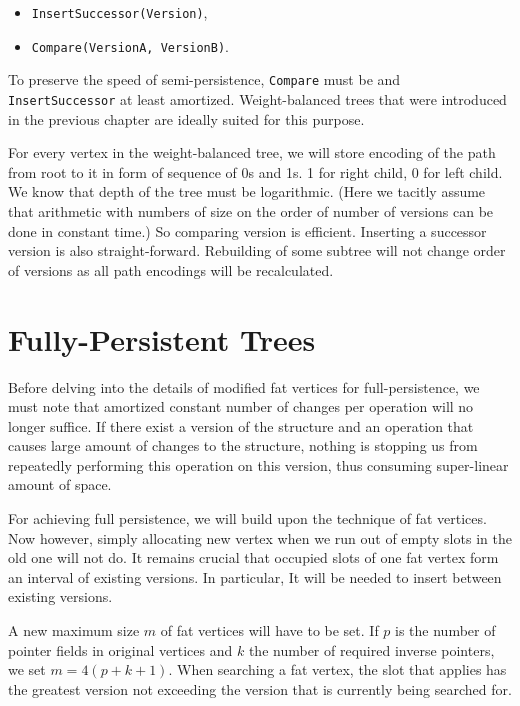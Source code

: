 \begin{itemize}
	\item \texttt{InsertSuccessor(Version)},
	\item \texttt{Compare(VersionA, VersionB)}.
\end{itemize}

To preserve the speed of semi-persistence, \texttt{Compare} must be  and \texttt{InsertSuccessor}  at least amortized. Weight-balanced trees that were introduced in the previous chapter are ideally suited for this purpose.

For every vertex in the weight-balanced tree, we will store encoding of the path from root to it in form of sequence of 0s and 1s. 1 for right child, 0 for left child. We know that depth of the tree must be logarithmic. (Here we tacitly assume that arithmetic with numbers of size on the order of number of versions can be done in constant time.) So comparing version is efficient. Inserting a successor version is also straight-forward. Rebuilding of some subtree will not change order of versions as all path encodings will be recalculated.

\section{Fully-Persistent Trees}

Before delving into the details of modified fat vertices for full-persistence, we must note that amortized constant number of changes per operation will no longer suffice. If there exist a version of the structure and an operation that causes large amount of changes to the structure, nothing is stopping us from repeatedly performing this operation on this version, thus consuming super-linear amount of space.

For achieving full persistence, we will build upon the technique of fat vertices. Now however, simply allocating new vertex when we run out of empty slots in the old one will not do. It remains crucial that occupied slots of one fat vertex form an interval of existing versions. In particular, It will be needed to insert between existing versions.

A new maximum size $m$ of fat vertices will have to be set. If $p$ is the number of pointer fields in original vertices and $k$ the number of required inverse pointers, we set $m = 4(p+k+1)$.
When searching a fat vertex, the slot that applies has the greatest version not exceeding the version that is currently being searched for.


